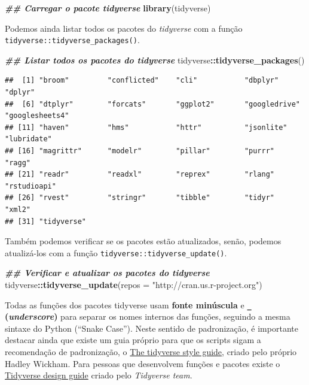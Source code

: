\documentclass[
]{article}
\newenvironment{Shaded}{\begin{snugshade}}{\end{snugshade}}
\newcommand{\AttributeTok}[1]{\textcolor[rgb]{0.13,0.29,0.53}{#1}}
\newcommand{\DocumentationTok}[1]{\textcolor[rgb]{0.56,0.35,0.01}{\textbf{\textit{#1}}}}
\newcommand{\FunctionTok}[1]{\textcolor[rgb]{0.13,0.29,0.53}{\textbf{#1}}}
\newcommand{\NormalTok}[1]{#1}
\newcommand{\SpecialCharTok}[1]{\textcolor[rgb]{0.81,0.36,0.00}{\textbf{#1}}}
\newcommand{\StringTok}[1]{\textcolor[rgb]{0.31,0.60,0.02}{#1}}
\begin{document}
\begin{Shaded}
\begin{Highlighting}[]
\DocumentationTok{\#\# Carregar o pacote tidyverse}
\FunctionTok{library}\NormalTok{(tidyverse)}
\end{Highlighting}
\end{Shaded}

Podemos ainda listar todos os pacotes do \emph{tidyverse} com a função \texttt{tidyverse::tidyverse\_packages()}.

\begin{Shaded}
\begin{Highlighting}[]
\DocumentationTok{\#\# Listar todos os pacotes do tidyverse }
\NormalTok{tidyverse}\SpecialCharTok{::}\FunctionTok{tidyverse\_packages}\NormalTok{()}
\end{Highlighting}
\end{Shaded}

\begin{verbatim}
##  [1] "broom"         "conflicted"    "cli"           "dbplyr"        "dplyr"        
##  [6] "dtplyr"        "forcats"       "ggplot2"       "googledrive"   "googlesheets4"
## [11] "haven"         "hms"           "httr"          "jsonlite"      "lubridate"    
## [16] "magrittr"      "modelr"        "pillar"        "purrr"         "ragg"         
## [21] "readr"         "readxl"        "reprex"        "rlang"         "rstudioapi"   
## [26] "rvest"         "stringr"       "tibble"        "tidyr"         "xml2"         
## [31] "tidyverse"
\end{verbatim}

Também podemos verificar se os pacotes estão atualizados, senão, podemos atualizá-los com a função \texttt{tidyverse::tidyverse\_update()}.

\begin{Shaded}
\begin{Highlighting}[]
\DocumentationTok{\#\# Verificar e atualizar os pacotes do tidyverse }
\NormalTok{tidyverse}\SpecialCharTok{::}\FunctionTok{tidyverse\_update}\NormalTok{(}\AttributeTok{repos =} \StringTok{"http://cran.us.r{-}project.org"}\NormalTok{)}
\end{Highlighting}
\end{Shaded}

Todas as funções dos pacotes tidyverse usam \textbf{fonte minúscula} e \textbf{\texttt{\_} (\emph{underscore})} para separar os nomes internos das funções, seguindo a mesma sintaxe do Python (``Snake Case''). Neste sentido de padronização, é importante destacar ainda que existe um guia próprio para que os scripts sigam a recomendação de padronização, o \href{https://style.tidyverse.org/}{The tidyverse style guide}, criado pelo próprio Hadley Wickham. Para pessoas que desenvolvem funções e pacotes existe o \href{https://design.tidyverse.org/}{Tidyverse design guide} criado pelo \emph{Tidyverse team}.
\end{document}
